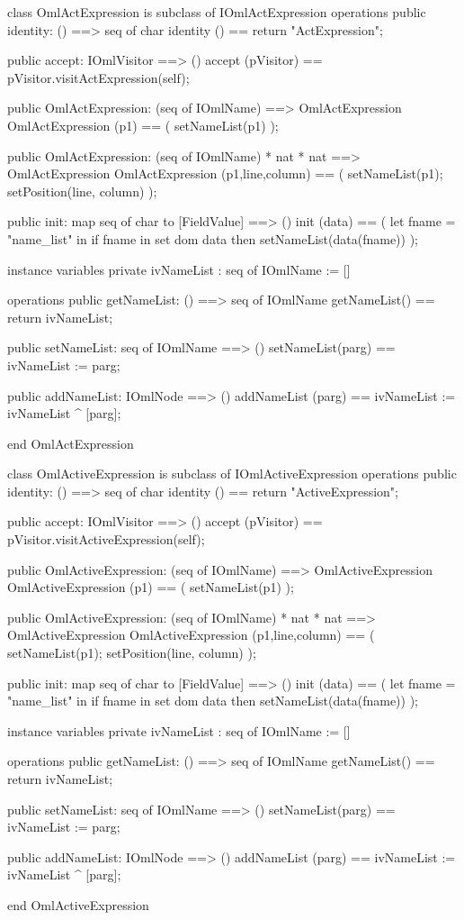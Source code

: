\begin{vdm_al}
class OmlActExpression is subclass of IOmlActExpression
operations
  public identity: () ==> seq of char
  identity () == return "ActExpression";

  public accept: IOmlVisitor ==> ()
  accept (pVisitor) == pVisitor.visitActExpression(self);

  public OmlActExpression:
    (seq of IOmlName) ==> OmlActExpression
  OmlActExpression (p1) == 
    ( setNameList(p1) );

  public OmlActExpression:
    (seq of IOmlName) *
    nat *
    nat ==> OmlActExpression
  OmlActExpression (p1,line,column) == 
    ( setNameList(p1);
      setPosition(line, column) );

  public init: map seq of char to [FieldValue] ==> ()
  init (data) ==
    ( let fname = "name_list" in
        if fname in set dom data
        then setNameList(data(fname)) );

instance variables
  private ivNameList : seq of IOmlName := []

operations
  public getNameList: () ==> seq of IOmlName
  getNameList() == return ivNameList;

  public setNameList: seq of IOmlName ==> ()
  setNameList(parg) == ivNameList := parg;

  public addNameList: IOmlNode ==> ()
  addNameList (parg) == ivNameList := ivNameList ^ [parg];

end OmlActExpression
\end{vdm_al}

\begin{vdm_al}
class OmlActiveExpression is subclass of IOmlActiveExpression
operations
  public identity: () ==> seq of char
  identity () == return "ActiveExpression";

  public accept: IOmlVisitor ==> ()
  accept (pVisitor) == pVisitor.visitActiveExpression(self);

  public OmlActiveExpression:
    (seq of IOmlName) ==> OmlActiveExpression
  OmlActiveExpression (p1) == 
    ( setNameList(p1) );

  public OmlActiveExpression:
    (seq of IOmlName) *
    nat *
    nat ==> OmlActiveExpression
  OmlActiveExpression (p1,line,column) == 
    ( setNameList(p1);
      setPosition(line, column) );

  public init: map seq of char to [FieldValue] ==> ()
  init (data) ==
    ( let fname = "name_list" in
        if fname in set dom data
        then setNameList(data(fname)) );

instance variables
  private ivNameList : seq of IOmlName := []

operations
  public getNameList: () ==> seq of IOmlName
  getNameList() == return ivNameList;

  public setNameList: seq of IOmlName ==> ()
  setNameList(parg) == ivNameList := parg;

  public addNameList: IOmlNode ==> ()
  addNameList (parg) == ivNameList := ivNameList ^ [parg];

end OmlActiveExpression
\end{vdm_al}

